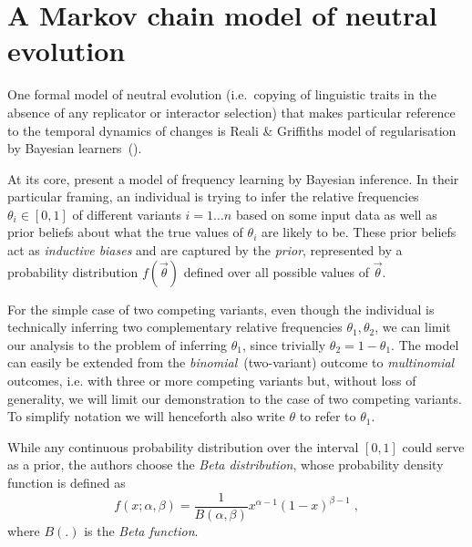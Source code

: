 \section{A Markov chain model of neutral evolution}
\label{sec:realigriffiths}

One formal model of neutral evolution (i.e.~copying of linguistic traits in the absence of any replicator or interactor selection) that makes particular reference to the temporal dynamics of changes is Reali \& Griffiths model of regularisation by Bayesian learners~(\citeyear{Reali2009,Reali2010}).

At its core, \citeauthor{Reali2009} present a model of frequency learning by Bayesian inference. In their particular framing, an individual is trying to infer the relative frequencies $\theta_i \in [0,1]$ of different variants $i=1\ldots n$ based on some input data as well as prior beliefs about what the true values of $\theta_i$ are likely to be. These prior beliefs act as \emph{inductive biases} and are captured by the \emph{prior}, represented by a probability distribution $f(\vec{\theta})$ defined over all possible values of $\vec{\theta}$.

For the simple case of two competing variants, even though the individual is technically inferring two complementary relative frequencies $\theta_1, \theta_2$, we can limit our analysis to the problem of inferring $\theta_1$, since trivially $\theta_2=1-\theta_1$. The model can easily be extended from the \emph{binomial}~(two-variant) outcome to \emph{multinomial} outcomes, i.e. with three or more competing variants but, without loss of generality, we will limit our demonstration to the case of two competing variants. To simplify notation we will henceforth also write $\theta$ to refer to $\theta_1$.

While any continuous probability distribution over the interval $[0,1]$ could serve as a prior, the authors choose the \emph{Beta distribution}, whose probability density function is defined as
\begin{equation}
f(x;\alpha,\beta) = \frac{1}{B(\alpha,\beta)} x^{\alpha-1}(1-x)^{\beta-1}\;,
\end{equation}
where $B(.)$ is the \emph{Beta function}.

